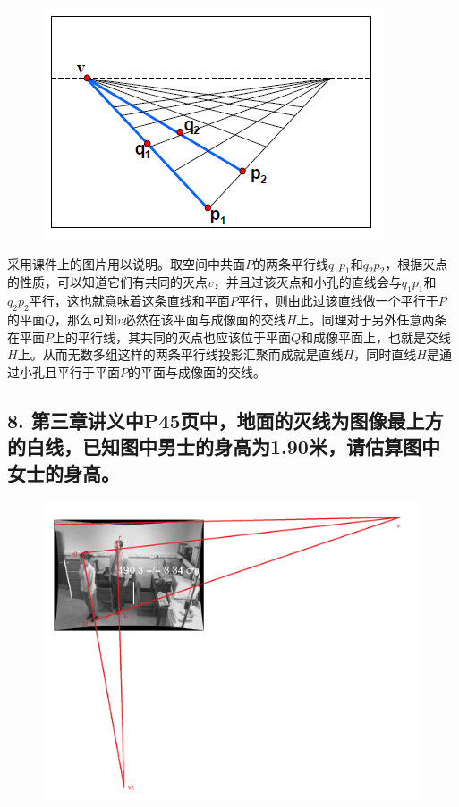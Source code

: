 \documentclass[]{article}
\begin{document}
\begin{figure}
\centerline{\includegraphics[width=\linewidth]{figures/1-7-ans.png}}
\caption{}
\end{figure}

采用课件上的图片用以说明。取空间中共面\(P\)的两条平行线\(q_1p_1\)和\(q_2p_2\)，根据灭点的性质，可以知道它们有共同的灭点\(v\)，并且过该灭点和小孔的直线会与\(q_1p_1\)和\(q_2p_2\)平行，这也就意味着这条直线和平面\(P\)平行，则由此过该直线做一个平行于\(P\)的平面\(Q\)，那么可知\(v\)必然在该平面与成像面的交线\(H\)上。同理对于另外任意两条在平面\(P\)上的平行线，其共同的灭点也应该位于平面\(Q\)和成像平面上，也就是交线\(H\)上。从而无数多组这样的两条平行线投影汇聚而成就是直线\(H\)，同时直线\(H\)是通过小孔且平行于平面\(P\)的平面与成像面的交线。

\hypertarget{header-n8}{%
\subsection{8. 第三章讲义中P45页中，地面的灭线为图像最上方的白线，已知图中男士的身高为1.90米，请估算图中女士的身高。}\label{header-n8}}

\begin{figure}
\centerline{\includegraphics[width=.8\linewidth]{figures/1-8-ans.png}}
\caption{}
\end{figure}
\end{document}
